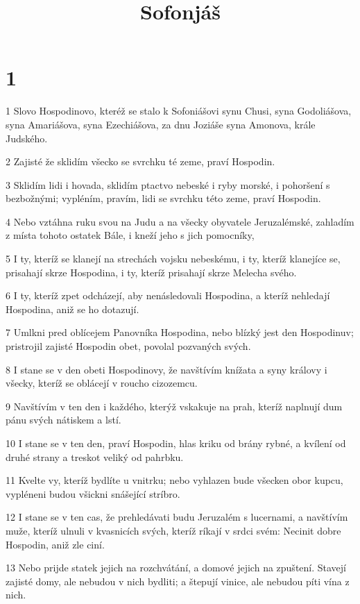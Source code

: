 

\title{Sofonjáš}

\chapter{1}

\par 1 Slovo Hospodinovo, kteréž se stalo k Sofoniášovi synu Chusi, syna Godoliášova, syna Amariášova, syna Ezechiášova, za dnu Joziáše syna Amonova, krále Judského.
\par 2 Zajisté že sklidím všecko se svrchku té zeme, praví Hospodin.
\par 3 Sklidím lidi i hovada, sklidím ptactvo nebeské i ryby morské, i pohoršení s bezbožnými; vypléním, pravím, lidi se svrchku této zeme, praví Hospodin.
\par 4 Nebo vztáhna ruku svou na Judu a na všecky obyvatele Jeruzalémské, zahladím z místa tohoto ostatek Bále, i kneží jeho s jich pomocníky,
\par 5 I ty, kteríž se klanejí na strechách vojsku nebeskému, i ty, kteríž klanejíce se, prisahají skrze Hospodina, i ty, kteríž prisahají skrze Melecha svého.
\par 6 I ty, kteríž zpet odcházejí, aby nenásledovali Hospodina, a kteríž nehledají Hospodina, aniž se ho dotazují.
\par 7 Umlkni pred oblícejem Panovníka Hospodina, nebo blízký jest den Hospodinuv; pristrojil zajisté Hospodin obet, povolal pozvaných svých.
\par 8 I stane se v den obeti Hospodinovy, že navštívím knížata a syny královy i všecky, kteríž se oblácejí v roucho cizozemcu.
\par 9 Navštívím v ten den i každého, kterýž vskakuje na prah, kteríž naplnují dum pánu svých nátiskem a lstí.
\par 10 I stane se v ten den, praví Hospodin, hlas kriku od brány rybné, a kvílení od druhé strany a treskot veliký od pahrbku.
\par 11 Kvelte vy, kteríž bydlíte u vnitrku; nebo vyhlazen bude všecken obor kupcu, vypléneni budou všickni snášející stríbro.
\par 12 I stane se v ten cas, že prehledávati budu Jeruzalém s lucernami, a navštívím muže, kteríž ulnuli v kvasnicích svých, kteríž ríkají v srdci svém: Necinit dobre Hospodin, aniž zle ciní.
\par 13 Nebo prijde statek jejich na rozchvátání, a domové jejich na zpuštení. Stavejí zajisté domy, ale nebudou v nich bydliti; a štepují vinice, ale nebudou píti vína z nich.
